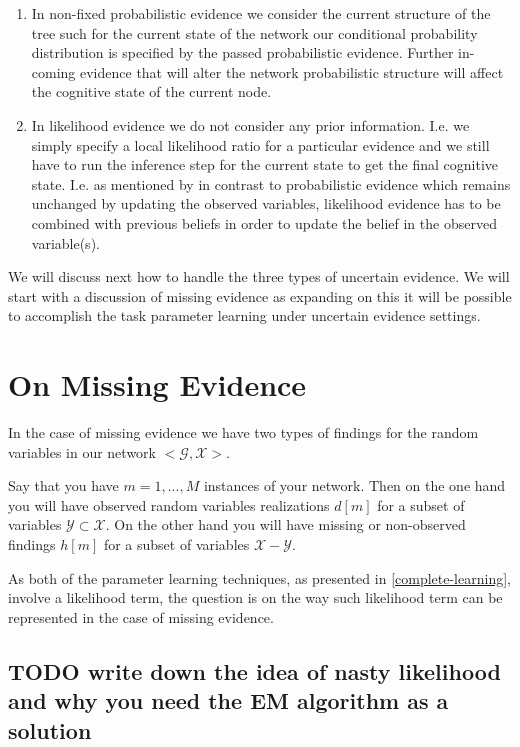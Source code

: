 \documentclass[11pt]{article}
\begin{document}
\begin{article}
\begin{enumerate}
\item In non-fixed probabilistic evidence we consider the current
structure of the tree such for the current state of the network
our conditional probability distribution is specified by the
passed probabilistic evidence. Further in-coming evidence that
will alter the network probabilistic structure will affect the
cognitive state of the current node.

\item In likelihood evidence we do not consider any prior
information. I.e. we simply specify a local likelihood ratio for
a particular evidence and we still have to run the inference step
for the current state to get the final cognitive state. I.e. as
mentioned by \cite{Mrad_2015} in contrast to probabilistic evidence
which remains unchanged by updating the observed variables,
likelihood evidence has to be combined with previous beliefs in
order to update the belief in the observed variable(s).
\end{enumerate}

We will discuss next how to handle the three types of uncertain
evidence. We will start with a discussion of missing evidence as
expanding on this it will be possible to accomplish the task
parameter learning under uncertain evidence settings.


\section{On Missing Evidence}
\label{sec:org6870e7b}

In the case of missing evidence we have two types of findings for
the random variables in our network \(<\mathscr{G}, \mathscr{X}>\).

Say that you have \(m = 1, ..., M\) instances of your network. Then on
the one hand you will have observed random variables realizations
\(d[m]\) for a subset of variables \(\mathscr{Y} \subset
  \mathscr{X}\). On the other hand you will have missing or
non-observed findings \(h[m]\) for a subset of variables
\(\mathscr{X} - \mathscr{Y}\).

As both of the parameter learning techniques, as presented in
\ref{complete-learning}, involve a likelihood term, the question is on
the way such likelihood term can be represented in the case of
missing evidence.

\subsection{{\bfseries\sffamily TODO} write down the idea of nasty likelihood and why you need the EM algorithm as a solution}
\label{sec:org48dfe09}


\end{article}
\end{document}
